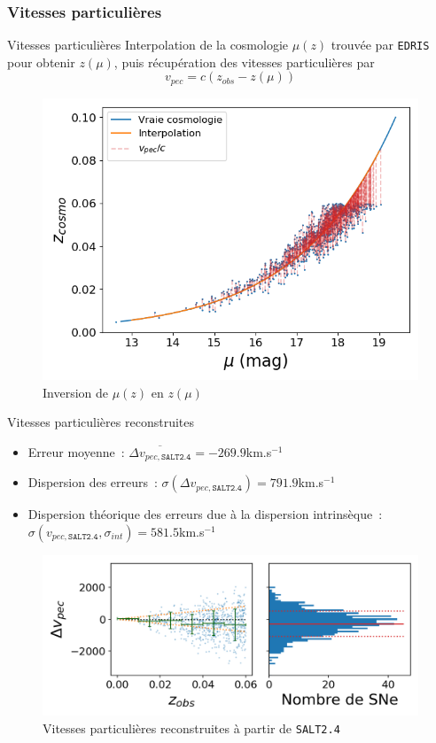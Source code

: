 \documentclass{beamer}
\def\edris{\texttt{EDRIS}\xspace}
\def\saltd{\texttt{SALT2.4}\xspace}
\begin{document}
\subsubsection{Vitesses particulières}
\begin{frame}{Vitesses particulières}
Interpolation de la cosmologie $\mu(z)$ trouvée par \edris pour obtenir $z(\mu)$, puis récupération des vitesses particulières par
\begin{equation}
	v_{pec} = c(z_{obs} - z(\mu))
\end{equation}
\begin{figure}
	\centering
	\includegraphics[width=.48\textwidth]{figures/z_mu.png}
	\caption{Inversion de $\mu(z)$ en $z(\mu)$}
\end{figure}
\end{frame}


\begin{frame}{Vitesses particulières reconstruites}
\begin{itemize}
\item Erreur moyenne~: $\overline{\Delta v_{pec, \saltd}} = -269.9$km.s$^{-1}$
\item Dispersion des erreurs~: $\sigma(\Delta v_{pec, \saltd}) = 791.9$km.s$^{-1}$
\item Dispersion théorique des erreurs due à la dispersion intrinsèque~: $\sigma(v_{pec, \saltd}, \sigma_{int}) = 581.5$km.s$^{-1}$
\end{itemize}
\begin{figure}
	\centering
	\includegraphics[width=.8\textwidth]{figures/vp_salt_clean.png}
	\caption{Vitesses particulières reconstruites à partir de \saltd}
\end{figure}
\end{frame}
\end{document}

